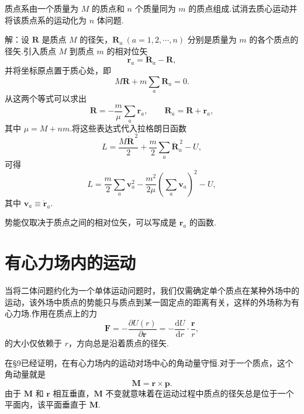 \begin{xiti}

\quad 质点系由一个质量为 $M$ 的质点和 $n$ 个质量同为 $m$ 的质点组成.试消去质心运动并将该质点系的运动化为 $n$ 体问题.

解：设 $\boldsymbol{R}$ 是质点 $M$ 的径矢，$\boldsymbol{R}_a\ (a=1,2,\cdots,n)$ 分别是质量为 $m$ 的各个质点的径矢.引入质点 $M$ 到质点 $m$ 的相对位矢
\begin{equation*}
  \boldsymbol{r}_a=\boldsymbol{R}_a-\boldsymbol{R},
\end{equation*}
并将坐标原点置于质心处，即
\begin{equation*}
  M\boldsymbol{R}+m\sum_a\boldsymbol{R}_a=0.
\end{equation*}
从这两个等式可以求出
\begin{equation*}
  \boldsymbol{R}=-\frac{m}{\mu}\sum_a\boldsymbol{r}_a,\qquad
  \boldsymbol{R}_a=\boldsymbol{R}+\boldsymbol{r}_a,
\end{equation*}
其中 $\mu=M+nm$.将这些表达式代入拉格朗日函数
\begin{equation*}
  L=\frac{M\dot{\boldsymbol{R}}^{\,2}}{2}
  +\frac{m}{2}\sum_a\dot{\boldsymbol{R}}_a^{\,2}-U,
\end{equation*}
可得
\begin{equation*}
  L=\frac{m}{2}\sum_a\boldsymbol{v}_a^2
  -\frac{m^2}{2\mu}\left(\sum_a\boldsymbol{v}_a\right)^2-U,
\end{equation*}
其中 $\boldsymbol{v}_a\equiv\dot{\boldsymbol{r}}_a$.

势能仅取决于质点之间的相对位矢，可以写成是 $\boldsymbol{r}_a$ 的函数.

\end{xiti}

\section{有心力场内的运动}

当将二体问题约化为一个单体运动问题时，我们仅需确定单个质点在某种外场中的运动，该外场中质点的势能只与质点到某一固定点的距离有关，这样的外场称为有心力场.作用在质点上的力
\begin{equation*}
  \boldsymbol{F}=-\frac{\partial U(r)}{\partial\boldsymbol{r}}
  =-\frac{\mathrm{d}U}{\mathrm{d}r}\cdot\frac{\boldsymbol{r}}{r},
\end{equation*}
的大小仅依赖于 $r$，方向总是沿着质点的径矢.

在§9已经证明，在有心力场内的运动对场中心的角动量守恒.对于一个质点，这个角动量就是
\begin{equation*}
  \boldsymbol{M}=\boldsymbol{r}\times\boldsymbol{p}.
\end{equation*}
由于 $\boldsymbol{M}$ 和 $\boldsymbol{r}$ 相互垂直，$\boldsymbol{M}$ 不变就意味着在运动过程中质点的径矢总是位于一个平面内，该平面垂直于 $\boldsymbol{M}$.

